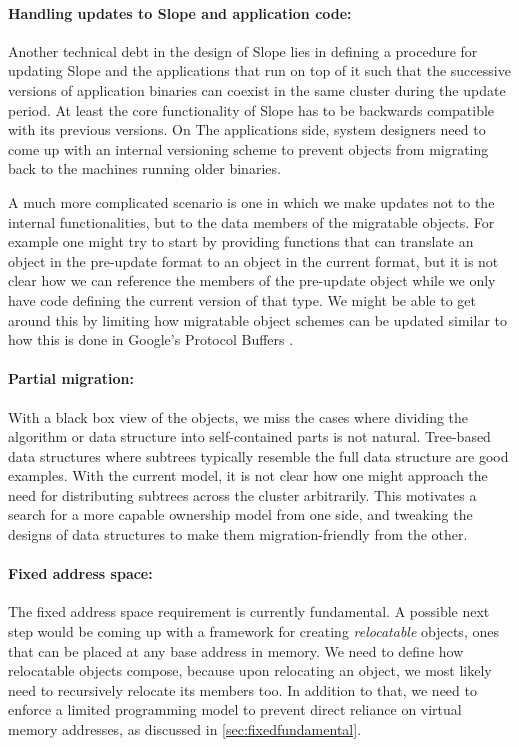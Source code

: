 \paragraph{Handling updates to Slope and application code:} Another technical
debt in the design of Slope lies in defining a procedure for updating Slope and
the applications that run on top of it such that the successive versions of
application binaries can coexist in the same cluster during the update period.
At least the core
functionality of Slope has to be backwards compatible with its previous versions.
On The applications side, system designers need to come up with an internal versioning
scheme to prevent objects from migrating back to the machines running older
binaries.

A much more complicated scenario
is one in which we make updates not to the internal functionalities, but to the
data members of the migratable objects. For example one might try to start by
providing functions that can translate an object in the pre-update format to an
object
in the current format, but it is not clear how we can reference the members of the
pre-update object while we only have code defining the current version of that type.
We might be able to get around this by limiting how migratable object schemes can be
updated similar to how this is done in Google's Protocol Buffers \cite{google:protobuf}.


\paragraph{Partial migration:}
With a black box view of the objects, we miss the cases where dividing the
algorithm or data structure into self-contained parts is not natural.
Tree-based data structures where subtrees typically resemble the full data
structure are good examples. With the current model, it is not
clear how one might approach the need for distributing subtrees across the
cluster arbitrarily. This motivates a search for a more capable ownership model
from one side, and tweaking the designs of data structures to make them
migration-friendly from the other.

\paragraph{Fixed address space:}
The fixed address space requirement is currently fundamental. A possible next
step would be coming up with a framework for creating \emph{relocatable}
objects, ones that can be placed at any base address in memory. We need
to define how relocatable objects compose, because upon relocating an object,
we most likely need to recursively relocate its members too. In addition to
that, we need to enforce a limited programming model to prevent direct reliance
on virtual memory addresses, as discussed in \autoref{sec:fixedfundamental}.


